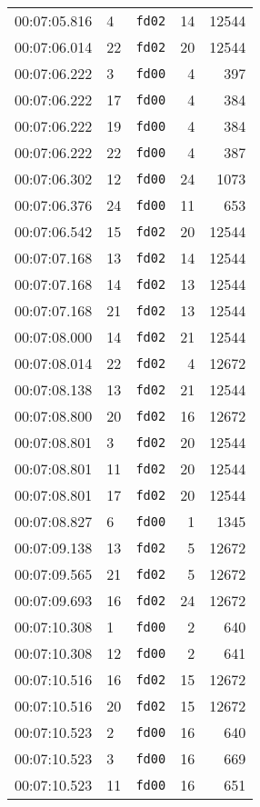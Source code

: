 \documentclass{article}
\begin{document}
\begin{longtable}{lllrr}
00:07:05.816 & 4 & \texttt{fd02} & 14 & 12544 \\
00:07:06.014 & 22 & \texttt{fd02} & 20 & 12544 \\
00:07:06.222 & 3 & \texttt{fd00} & 4 & 397 \\
00:07:06.222 & 17 & \texttt{fd00} & 4 & 384 \\
00:07:06.222 & 19 & \texttt{fd00} & 4 & 384 \\
00:07:06.222 & 22 & \texttt{fd00} & 4 & 387 \\
00:07:06.302 & 12 & \texttt{fd00} & 24 & 1073 \\
00:07:06.376 & 24 & \texttt{fd00} & 11 & 653 \\
00:07:06.542 & 15 & \texttt{fd02} & 20 & 12544 \\
00:07:07.168 & 13 & \texttt{fd02} & 14 & 12544 \\
00:07:07.168 & 14 & \texttt{fd02} & 13 & 12544 \\
00:07:07.168 & 21 & \texttt{fd02} & 13 & 12544 \\
00:07:08.000 & 14 & \texttt{fd02} & 21 & 12544 \\
00:07:08.014 & 22 & \texttt{fd02} & 4 & 12672 \\
00:07:08.138 & 13 & \texttt{fd02} & 21 & 12544 \\
00:07:08.800 & 20 & \texttt{fd02} & 16 & 12672 \\
00:07:08.801 & 3 & \texttt{fd02} & 20 & 12544 \\
00:07:08.801 & 11 & \texttt{fd02} & 20 & 12544 \\
00:07:08.801 & 17 & \texttt{fd02} & 20 & 12544 \\
00:07:08.827 & 6 & \texttt{fd00} & 1 & 1345 \\
00:07:09.138 & 13 & \texttt{fd02} & 5 & 12672 \\
00:07:09.565 & 21 & \texttt{fd02} & 5 & 12672 \\
00:07:09.693 & 16 & \texttt{fd02} & 24 & 12672 \\
00:07:10.308 & 1 & \texttt{fd00} & 2 & 640 \\
00:07:10.308 & 12 & \texttt{fd00} & 2 & 641 \\
00:07:10.516 & 16 & \texttt{fd02} & 15 & 12672 \\
00:07:10.516 & 20 & \texttt{fd02} & 15 & 12672 \\
00:07:10.523 & 2 & \texttt{fd00} & 16 & 640 \\
00:07:10.523 & 3 & \texttt{fd00} & 16 & 669 \\
00:07:10.523 & 11 & \texttt{fd00} & 16 & 651 \\

\end{longtable}
\end{document}
